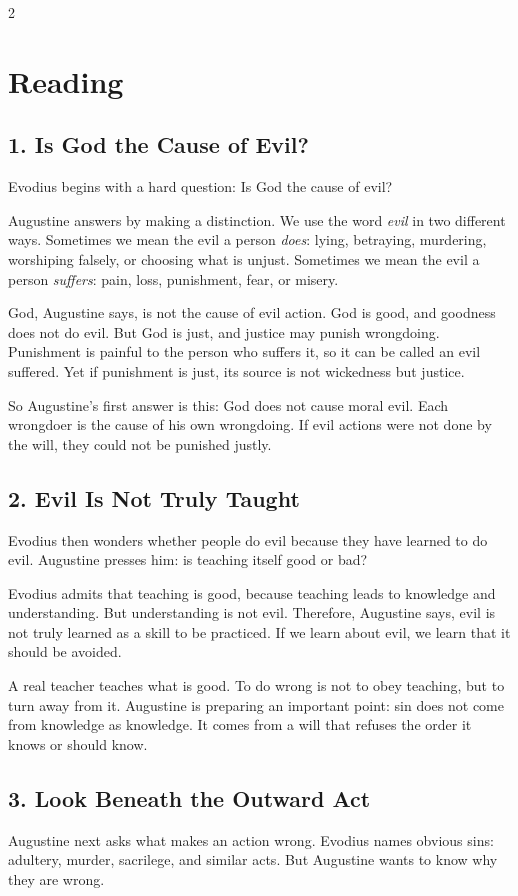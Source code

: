 \documentclass[12pt]{article}
\begin{document}
\begin{multicols}{2}
\section*{Reading}

\subsection*{1. Is God the Cause of Evil?}
Evodius begins with a hard question: Is God the cause of evil?

Augustine answers by making a distinction. We use the word \textit{evil} in two different ways. Sometimes we mean the evil a person \textit{does}: lying, betraying, murdering, worshiping falsely, or choosing what is unjust. Sometimes we mean the evil a person \textit{suffers}: pain, loss, punishment, fear, or misery.

God, Augustine says, is not the cause of evil action. God is good, and goodness does not do evil. But God is just, and justice may punish wrongdoing. Punishment is painful to the person who suffers it, so it can be called an evil suffered. Yet if punishment is just, its source is not wickedness but justice.

So Augustine's first answer is this: God does not cause moral evil. Each wrongdoer is the cause of his own wrongdoing. If evil actions were not done by the will, they could not be punished justly.

\subsection*{2. Evil Is Not Truly Taught}
Evodius then wonders whether people do evil because they have learned to do evil. Augustine presses him: is teaching itself good or bad?

Evodius admits that teaching is good, because teaching leads to knowledge and understanding. But understanding is not evil. Therefore, Augustine says, evil is not truly learned as a skill to be practiced. If we learn about evil, we learn that it should be avoided.

A real teacher teaches what is good. To do wrong is not to obey teaching, but to turn away from it. Augustine is preparing an important point: sin does not come from knowledge as knowledge. It comes from a will that refuses the order it knows or should know.

\subsection*{3. Look Beneath the Outward Act}
Augustine next asks what makes an action wrong. Evodius names obvious sins: adultery, murder, sacrilege, and similar acts. But Augustine wants to know why they are wrong.


\end{multicols}
\end{document}

